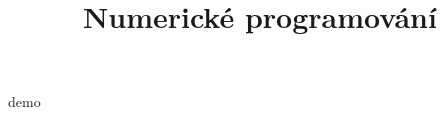 \documentclass[a4]{report}
\title{Numerické programování}
\begin{document}
    \maketitle
    \tableofcontents
demo
\end{document}
